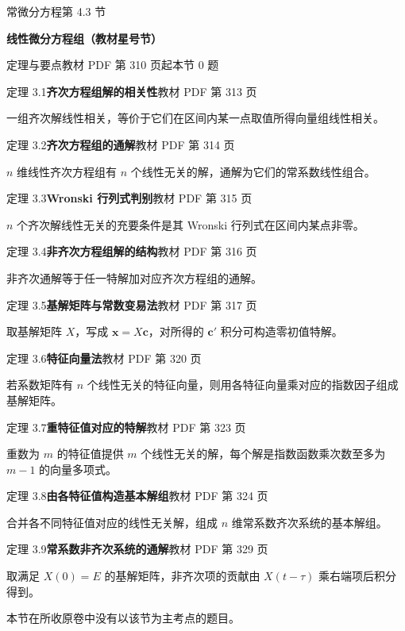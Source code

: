 \documentclass[UTF8,zihao=-4,fontset=fandol]{ctexart}
\newcommand{\SectionHeading}[4]{%
  \clearpage\hypertarget{sec-#1}{}%
  {\small\textcolor{accent}{#2\hfill 第 #1 节}}\par\medskip
  {\LARGE\bfseries #3}\par\smallskip
  {\small\textcolor{muted}{#4}}\par\bigskip}
\newcommand{\Theory}[4]{%
  {\small\textcolor{accent}{#1}\quad\textbf{#3}\hfill\textcolor{muted}{教材 PDF 第 #2 页}}\par
  {\small #4}\par\smallskip}
\begin{document}
\SectionHeading{4.3}{常微分方程}{线性微分方程组（教材星号节）}{定理与要点\quad 教材 PDF 第 310 页起\hfill 本节 0 题}
\Theory{定理 3.1}{313}{齐次方程组解的相关性}{一组齐次解线性相关，等价于它们在区间内某一点取值所得向量组线性相关。}
\Theory{定理 3.2}{314}{齐次方程组的通解}{\(n\) 维线性齐次方程组有 \(n\) 个线性无关的解，通解为它们的常系数线性组合。}
\Theory{定理 3.3}{315}{Wronski 行列式判别}{\(n\) 个齐次解线性无关的充要条件是其 Wronski 行列式在区间内某点非零。}
\Theory{定理 3.4}{316}{非齐次方程组解的结构}{非齐次通解等于任一特解加对应齐次方程组的通解。}
\Theory{定理 3.5}{317}{基解矩阵与常数变易法}{取基解矩阵 \(X\)，写成 \(\boldsymbol{x}=X\boldsymbol{c}\)，对所得的 \(\boldsymbol{c}'\) 积分可构造零初值特解。}
\Theory{定理 3.6}{320}{特征向量法}{若系数矩阵有 \(n\) 个线性无关的特征向量，则用各特征向量乘对应的指数因子组成基解矩阵。}
\Theory{定理 3.7}{323}{重特征值对应的特解}{重数为 \(m\) 的特征值提供 \(m\) 个线性无关的解，每个解是指数函数乘次数至多为 \(m-1\) 的向量多项式。}
\Theory{定理 3.8}{324}{由各特征值构造基本解组}{合并各不同特征值对应的线性无关解，组成 \(n\) 维常系数齐次系统的基本解组。}
\Theory{定理 3.9}{329}{常系数非齐次系统的通解}{取满足 \(X(0)=E\) 的基解矩阵，非齐次项的贡献由 \(X(t-\tau)\) 乘右端项后积分得到。}
本节在所收原卷中没有以该节为主考点的题目。
\end{document}
